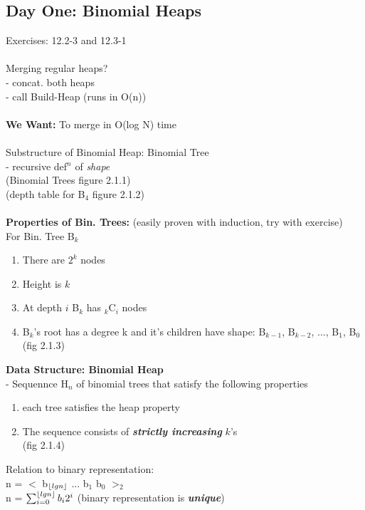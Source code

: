 \documentclass{article}
\DeclarePairedDelimiter\floor{\lfloor}{\rfloor}
\begin{document}
		\subsection{Day One: Binomial Heaps}
		Exercises: 12.2-3 and 12.3-1 \\\\
		Merging regular heaps?\\
		- concat. both heaps\\
		- call Build-Heap (runs in O(n))\\\\
		\textbf{We Want:} To merge in O(log N) time\\\\
		Substructure of Binomial Heap: Binomial Tree\\
		 - recursive def$^{n}$ of \emph{shape}\\
		 (Binomial Trees figure 2.1.1)\\
		 (depth table for B$_4$ figure 2.1.2)\\\\
		 \textbf{Properties of Bin. Trees:} (easily proven with induction, try with exercise)\\
		    For Bin. Tree B$_k$
		 \begin{enumerate}
		 	\item There are $2^k$ nodes
		 	\item Height is $k$
		 	\item At depth $i$ B$_k$ has $_k$C$_i$ nodes
		 	\item B$_k$'s root has a degree k and it's children have shape: B$_{k-1}$, B$_{k-2}$, ..., B$_1$, B$_0$ (fig 2.1.3)\\
		 \end{enumerate}
		 \textbf{\Large Data Structure: Binomial Heap}\\ \large
		 - Sequennce H$_n$ of binomial trees that satisfy the following properties
		 \begin{enumerate}
		 	\item each tree satisfies the heap property
		 	\item The sequence consists of \textbf{\emph{strictly increasing}} $k$'s\\
		 	(fig 2.1.4)\\
		 \end{enumerate}
		 Relation to binary representation: \\
		 n = $<$ b$_{\floor{lg n}}$ ... b$_1$ b$_0$ $>_2$\\
		 n = $\sum_{i=0}^{\floor{lg n}} b_i 2^i$ (binary representation is \textbf{\emph{unique}})\\
\end{document}
